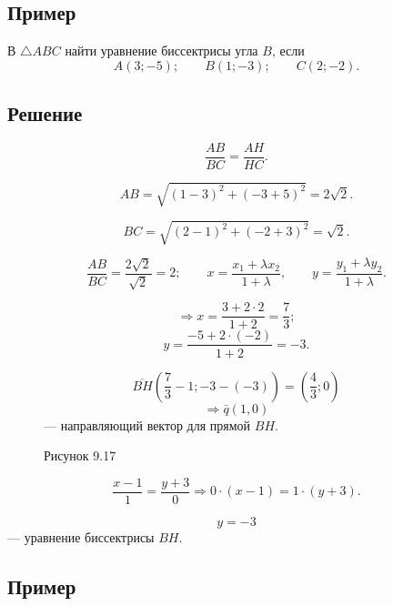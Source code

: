\documentclass[12pt,a4paper]{article}
\newcommand{\vq}{\bar q}
\begin{document}
\subsection*{\textbf{Пример}}

В $\triangle ABC$ найти уравнение биссектрисы угла $B$, если
$$
A(3;-5);\qquad B(1;-3);\qquad C(2;-2).
$$

\subsection*{\textbf{Решение}}

$$
\frac{AB}{BC}=\frac{AH}{HC}.
$$

$$
AB=\sqrt{(1-3)^2+(-3+5)^2}=2\sqrt2.
$$

$$
BC=\sqrt{(2-1)^2+(-2+3)^2}=\sqrt2.
$$

$$
\frac{AB}{BC}=\frac{2\sqrt2}{\sqrt2}=2;
\qquad
x=\frac{x_1+\lambda x_2}{1+\lambda},
\qquad
y=\frac{y_1+\lambda y_2}{1+\lambda}.
$$

$$
\Rightarrow x=\frac{3+2\cdot 2}{1+2}=\frac73;
$$
$$
y=\frac{-5+2\cdot(-2)}{1+2}=-3.
$$

\begin{figure}[H]
  \centering
  \begin{minipage}{0.4\textwidth}
    \centering
    \caption*{Рисунок 9.17}
  \end{minipage}%
  \begin{minipage}{0.55\textwidth}
    $$
    \overline{BH}\left(\frac73-1;-3-(-3)\right)
    =
    \left(\frac43;0\right)
    $$
    $$
    \Rightarrow \vq(1,0)
    $$
    --- направляющий вектор для прямой $BH$.
  \end{minipage}
\end{figure}

$$
\frac{x-1}{1}=\frac{y+3}{0}
\Rightarrow
0\cdot(x-1)=1\cdot(y+3).
$$

$$
y=-3
$$
--- уравнение биссектрисы $BH$.

\subsection*{\textbf{Пример}}
\end{document}
